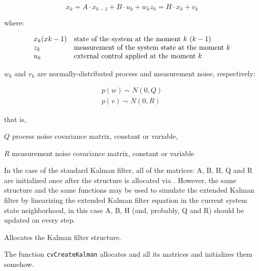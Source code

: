 \[
x_k=A \cdot x_{k-1}+B \cdot u_k+w_k
z_k=H \cdot x_k+v_k
\]

where:

\[
\begin{array}{l l}
x_k (x{k-1}) & \text{state of the system at the moment $k$ $(k-1)$ }\\
z_k & \text{measurement of the system state at the moment $k$}\\
u_k & \text{external control applied at the moment $k$}
\end{array}
\]

$w_k$ and $v_k$ are normally-distributed process and measurement noise, respectively:

\[
\begin{array}{l}
p(w) \sim N(0,Q)\\
p(v) \sim N(0,R)
\end{array}
\]

that is,

$Q$ process noise covariance matrix, constant or variable,

$R$ measurement noise covariance matrix, constant or variable

In the case of the standard Kalman filter, all of the matrices: A, B, H, Q and R are initialized once after the  structure is allocated via . However, the same structure and the same functions may be used to simulate the extended Kalman filter by linearizing the extended Kalman filter equation in the current system state neighborhood, in this case A, B, H (and, probably, Q and R) should be updated on every step.

\label{CreateKalman}

Allocates the Kalman filter structure.


\begin{description}
\end{description}

The function \texttt{cvCreateKalman} allocates  and all its matrices and initializes them somehow.


